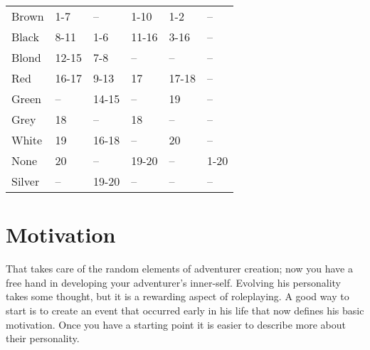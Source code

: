 \begin{multicols*}{2}
\begin{tcolorbox}[breakable,boxrule=0pt,after skip=0pt,before skip=5pt,title=\textbf{Hair Color}]
\begin{tabular}{l l l l l l}
Brown & 1-7 & -- & 1-10 & 1-2 & --\\
Black & 8-11 & 1-6 & 11-16 & 3-16 & --\\
Blond & 12-15 & 7-8 & -- & -- & --\\
Red & 16-17 & 9-13 & 17 & 17-18 & --\\
Green & -- & 14-15 & -- & 19 & --\\
Grey & 18 & -- & 18 & -- & --\\
White & 19 & 16-18 & -- & 20 & --\\
None & 20 & -- & 19-20 & -- & 1-20\\
Silver & -- & 19-20 & -- & -- & --
\end{tabular}
\end{tcolorbox}
\section{Motivation}
That takes care of the random elements of adventurer creation; now you have a free hand in developing your adventurer's inner-self. Evolving his personality takes some thought, but it is a rewarding aspect of roleplaying. A good way to start is to create an event that occurred early in his life that now defines his basic motivation. Once you have a starting point it is easier to describe more about their personality.


\end{multicols*}
